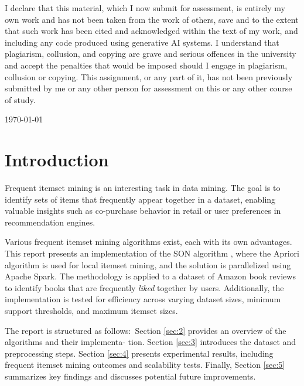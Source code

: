 \documentclass{Class/julia}
\begin{document}
\begin{titlepage}
\begin{center}
\begin{figure}[h!]
\end{figure}
\end{center}
\vfill
\begin{center}
{\small{I declare that this material, which I now submit for assessment, is entirely my own work and has not been taken from the work of others, save and to the extent that such work has been cited and acknowledged within the text of my work, and including any code produced using generative AI systems. I understand that plagiarism, collusion, and copying are grave and serious offences in the university and accept the penalties that would be imposed should I engage in plagiarism, collusion or copying. This assignment, or any part of it, has not been previously submitted by me or any other person for assessment on this or any other course of study.}}
\end{center}
\vfill
    {\large \today \par}
    \vfill
\end{titlepage}

\tableofcontents

\section{Introduction}

Frequent itemset mining is an interesting task in data mining. The goal is to identify sets of items that frequently appear together in a dataset, enabling valuable insights such as co-purchase behavior in retail or user preferences in recommendation engines.

Various frequent itemset mining algorithms exist, each with its own advantages. This report presents an implementation of the SON algorithm \citep{savasere1995efficient}, where the Apriori algorithm \citep{agrawal1994fast} is used for local itemset mining, and the solution is parallelized using Apache Spark. The methodology is applied to a dataset of Amazon book reviews \citep{amazon_books_reviews} to identify books that are frequently \textit{liked} together by users. Additionally, the implementation is tested for efficiency across varying dataset sizes, minimum support thresholds, and maximum itemset sizes.

The report is structured as follows:\ Section \ref{sec:2} provides an overview of the algorithms and their implementa- tion. Section \ref{sec:3} introduces the dataset and preprocessing steps. Section \ref{sec:4} presents experimental results, including frequent itemset mining outcomes and scalability tests. Finally, Section \ref{sec:5} summarizes key findings and discusses potential future improvements.
\end{document}
